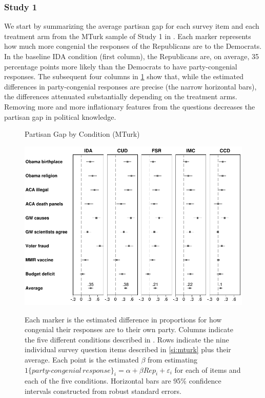 \documentclass[12pt, letterpaper]{article}
\begin{document}
\subsubsection*{Study 1}
We start by summarizing the average partisan gap for each survey item and each treatment arm from the MTurk sample of Study 1 in . Each marker represents how much more congenial the responses of the Republicans are to the Democrats. In the baseline IDA condition (first column), the Republicans are, on average, 35 percentage points more likely than the Democrats to have party-congenial responses. The subsequent four columns in \cref{fig:partisangaps-mturk} show that, while the estimated differences in party-congenial responses are precise (the narrow horizontal bars), the differences attenuated substantially depending on the treatment arms. Removing more and more inflationary features from the questions decreases the partisan gap in political knowledge.

%

\begin{center}
	\begin{figure}[t]
		\centering
		\caption{Partisan Gap by Condition (MTurk)}
		\includegraphics[width=\textwidth]{../figs/partisan-gap-by-item-arm.pdf}
		\label{fig:partisangaps-mturk}
		\caption*{\footnotesize 
			Each marker is the estimated difference in proportions for how congenial their responses are to their own party.
			Columns indicate the five different conditions described in . Rows indicate the nine individual survey question items described in \cref{si:mturk} plus their average.
			Each point is the estimated $\beta$ from estimating $1\{party\text{-}congenial\, response\}_i = \alpha + \beta Rep_i + \varepsilon_i$ for each of items and each of the five conditions.			
			Horizontal bars are 95\% confidence intervals constructed from robust standard errors.
		}
	\end{figure}
\end{center}
\end{document}

